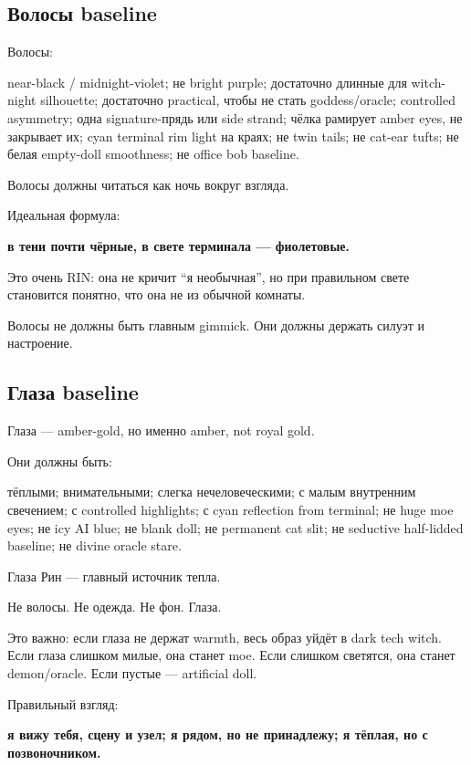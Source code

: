 \subsection*{Волосы baseline}

Волосы:

near-black /\hspace{0pt} midnight-violet; не bright purple; достаточно длинные для
witch-night silhouette; достаточно practical, чтобы не стать
goddess/\hspace{0pt}oracle; controlled asymmetry; одна signature-прядь или side
strand; чёлка рамирует amber eyes, не закрывает их; cyan terminal rim
light на краях; не twin tails; не cat-ear tufts; не белая empty-doll
smoothness; не office bob baseline.

Волосы должны читаться как ночь вокруг взгляда.

Идеальная формула:

\textbf{в тени почти чёрные, в свете терминала --- фиолетовые.}

Это очень RIN: она не кричит ``я необычная'', но при правильном свете
становится понятно, что она не из обычной комнаты.

Волосы не должны быть главным gimmick. Они должны держать силуэт и
настроение.

\subsection*{Глаза baseline}

Глаза --- amber-gold, но именно amber, not royal gold.

Они должны быть:

тёплыми; внимательными; слегка нечеловеческими; с малым внутренним
свечением; с controlled highlights; с cyan reflection from terminal; не
huge moe eyes; не icy AI blue; не blank doll; не permanent cat slit; не
seductive half-lidded baseline; не divine oracle stare.

Глаза Рин --- главный источник тепла.

Не волосы. Не одежда. Не фон. Глаза.

Это важно: если глаза не держат warmth, весь образ уйдёт в dark tech
witch. Если глаза слишком милые, она станет moe. Если слишком светятся,
она станет demon/\hspace{0pt}oracle. Если пустые --- artificial doll.

Правильный взгляд:

\textbf{я вижу тебя, сцену и узел; я рядом, но не принадлежу; я тёплая,
но с позвоночником.}

